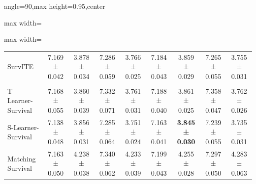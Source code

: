 \begin{table}[htbp]
{\begin{adjustbox}{angle=90,max height=0.95\textheight,center}
\begin{minipage}{\textheight}
\begin{adjustbox}{max width=\linewidth}
\begin{minipage}[c]{\linewidth}
\begin{adjustbox}{max width=\linewidth}
\begin{tabular}{l cc cc cc cc}
        SurvITE & 7.169 ± 0.042 & 3.878 ± 0.034 & 7.286 ± 0.059 & 3.766 ± 0.025 & 7.184 ± 0.043 & 3.859 ± 0.029 & 7.265 ± 0.055 & 3.755 ± 0.031 \\ 
        \addlinespace
        \multicolumn{7}{l}{\textit{Survival Meta-Learners}} \\
        T-Learner-Survival & 7.168 ± 0.055 & 3.860 ± 0.039 & 7.332 ± 0.071 & 3.761 ± 0.031 & 7.188 ± 0.040 & 3.861 ± 0.025 & 7.358 ± 0.047 & 3.762 ± 0.026 \\ 
        S-Learner-Survival & 7.138 ± 0.048 & 3.856 ± 0.031 & 7.285 ± 0.064 & 3.751 ± 0.024 & 7.163 ± 0.041 & \textbf{3.845 ± 0.030} & 7.239 ± 0.055 & 3.735 ± 0.031 \\
        Matching Survival & 7.163 ± 0.050 & 4.238 ± 0.038 & 7.340 ± 0.062 & 4.233 ± 0.039 & 7.199 ± 0.043 & 4.255 ± 0.028 & 7.297 ± 0.050 & 4.283 ± 0.063 \\ 
        \bottomrule
    \end{tabular}\end{adjustbox}
    \end{minipage}\end{adjustbox}\par
    \end{minipage}
    \end{adjustbox}
}
\end{table}
\endgroup